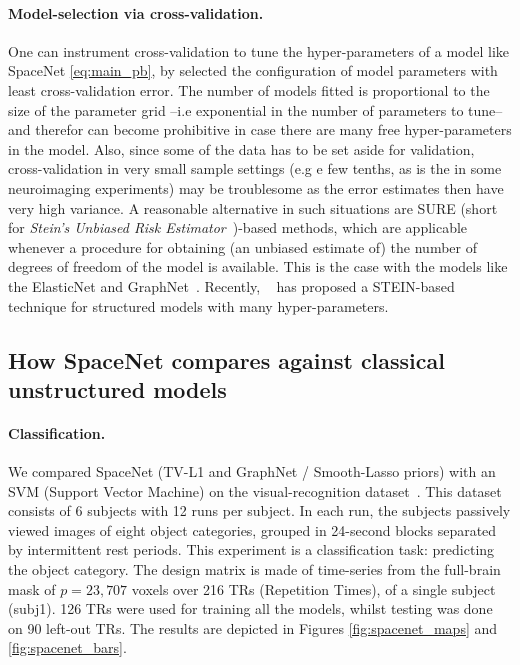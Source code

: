 \paragraph{Model-selection via cross-validation.}
One can instrument cross-validation to tune the hyper-parameters of a model like SpaceNet \eqref{eq:main_pb}, by selected the configuration of model parameters with least cross-validation error. The number of models fitted is proportional to the size of the parameter grid --i.e exponential in the number of parameters to tune-- and therefor can become prohibitive in case there are many free hyper-parameters in the model. Also, since some of the data has to be set aside for validation, cross-validation in very small sample settings (e.g e few tenths, as is the in some neuroimaging experiments) may be troublesome as the error estimates then have very high variance. A reasonable alternative in such situations are SURE (short for \textit{Stein's Unbiased Risk Estimator}~\citep{stein1981})-based methods,
which are applicable whenever a procedure for obtaining (an unbiased estimate of) the number of degrees of freedom of the model is available. This is the case with the models like the ElasticNet and
GraphNet~\citep{hebiri2011}. Recently, ~\citep{sugar} has proposed a STEIN-based technique for structured models with many hyper-parameters.


\subsection{How SpaceNet compares against classical unstructured models}
\paragraph{Classification.}
We compared SpaceNet (TV-L1 and GraphNet / Smooth-Lasso priors) with an SVM (Support Vector Machine) on the visual-recognition dataset~\citep{haxby2001}. This dataset consists of 6 subjects with 12 runs per subject. In each run, the subjects passively viewed images of eight object categories, grouped in 24-second blocks separated by intermittent rest periods. This experiment is a classification task: predicting the object category. The design matrix is made of time-series from the full-brain mask of $p=23,707$ voxels over 216 TRs (Repetition Times), of a single subject (subj1). 126 TRs were used for training all the models, whilst testing was done on 90 left-out TRs. The results are depicted in Figures \ref{fig:spacenet_maps} and \ref{fig:spacenet_bars}.

